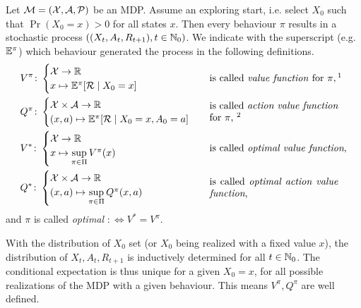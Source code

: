 \begin{definition} Let \(\mathcal{M}=(\mathcal{X},\mathcal{A},\mathcal{P})\) be an MDP. Assume an exploring start, i.e. select \(X_0\) such that \(\Pr({X_0=x})>0\) for all states \(x\). Then every behaviour \(\pi\) results in a stochastic process \(((X_t,A_t,R_{t+1}), t\in \mathbb{N}_0)\).
We indicate with the superscript (e.g. \(\mathbb{E}^\pi\)) which behaviour generated the process in the following definitions.
\begin{align*}
	&V^\pi\colon
	\begin{cases}
		\cX\to\R\\
		x\mapsto \E^\pi[\cR\mid X_0=x]
	\end{cases} 
	&& \text{is called \emph{value function} for } \pi, \footnotemark[1]
	\\
	&Q^\pi\colon
	\begin{cases}
		\cX\times\cA\to\R\\
		(x,a)\mapsto \E^\pi[\cR\mid X_0=x, A_0=a]
	\end{cases}
	&& \parbox{13em}{is called \emph{action value function} for \(\pi\), \footnotemark[2]}
	\\
	&V^*\colon
	\begin{cases}
		\cX\to\R\\
		x\mapsto \sup\limits_{\pi\in\Pi} V^\pi(x)
	\end{cases} 
	&& \text{is called \emph{optimal value function},}
	\\
	&Q^*\colon
	\begin{cases}
		\cX\times\cA\to\R\\
		(x,a)\mapsto \sup\limits_{\pi\in\Pi} Q^\pi(x,a)
	\end{cases}
	&& \parbox{13em}{is called \emph{optimal action value function},}
\end{align*}
and \(\pi\) is called \emph{optimal} \(:\iff V^*=V^\pi\).
\end{definition}

\begin{remark}
With the distribution of \(X_0\) set (or \(X_0\) being realized with a fixed value \(x\)), the distribution of \(X_t, A_t,R_{t+1}\) is inductively determined for all \(t\in\mathbb{N}_0\). The conditional expectation is thus unique for a given \(X_0=x\), for all possible realizations of the MDP with a given behaviour.
This means \(V^\pi, Q^\pi\) are well defined.
\end{remark}

